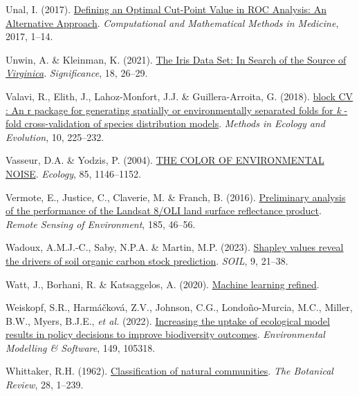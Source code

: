 \documentclass[
  letterpaper,
]{scrbook}
\newlength{\cslhangindent}
\newenvironment{CSLReferences}[2] %
 {\begin{list}{}{%
  \setlength{\itemindent}{0pt}
  \setlength{\leftmargin}{0pt}
  \setlength{\parsep}{0pt}
  \ifodd #1
   \setlength{\leftmargin}{\cslhangindent}
   \setlength{\itemindent}{-1\cslhangindent}
  \fi
  \setlength{\itemsep}{#2\baselineskip}}}
 {\end{list}}
\begin{document}
\begin{CSLReferences}{1}{0}
Unal, I. (2017). \href{https://doi.org/10.1155/2017/3762651}{Defining an
Optimal Cut-Point Value in ROC Analysis: An Alternative Approach}.
\emph{Computational and Mathematical Methods in Medicine}, 2017, 1--14.

Unwin, A. \& Kleinman, K. (2021).
\href{https://doi.org/10.1111/1740-9713.01589}{The Iris Data Set: In
Search of the Source of {\emph{Virginica}}}. \emph{Significance}, 18,
26--29.

Valavi, R., Elith, J., Lahoz-Monfort, J.J. \& Guillera-Arroita, G.
(2018). \href{https://doi.org/10.1111/2041-210x.13107}{block CV : An r
package for generating spatially or environmentally separated folds for
{\emph{k}} {-}fold cross{-}validation of species distribution models}.
\emph{Methods in Ecology and Evolution}, 10, 225--232.

Vasseur, D.A. \& Yodzis, P. (2004).
\href{https://doi.org/10.1890/02-3122}{THE COLOR OF ENVIRONMENTAL
NOISE}. \emph{Ecology}, 85, 1146--1152.

Vermote, E., Justice, C., Claverie, M. \& Franch, B. (2016).
\href{https://doi.org/10.1016/j.rse.2016.04.008}{Preliminary analysis of
the performance of the Landsat 8/OLI land surface reflectance product}.
\emph{Remote Sensing of Environment}, 185, 46--56.

Wadoux, A.M.J.-C., Saby, N.P.A. \& Martin, M.P. (2023).
\href{https://doi.org/10.5194/soil-9-21-2023}{Shapley values reveal the
drivers of soil organic carbon stock prediction}. \emph{SOIL}, 9,
21--38.

Watt, J., Borhani, R. \& Katsaggelos, A. (2020).
\href{https://doi.org/10.1017/9781108690935}{Machine learning refined}.

Weiskopf, S.R., Harmáčková, Z.V., Johnson, C.G., Londoño-Murcia, M.C.,
Miller, B.W., Myers, B.J.E., \emph{et al.} (2022).
\href{https://doi.org/10.1016/j.envsoft.2022.105318}{Increasing the
uptake of ecological model results in policy decisions to improve
biodiversity outcomes}. \emph{Environmental Modelling \& Software}, 149,
105318.

Whittaker, R.H. (1962).
\href{https://doi.org/10.1007/bf02860872}{Classification of natural
communities}. \emph{The Botanical Review}, 28, 1--239.


\end{CSLReferences}
\end{document}
